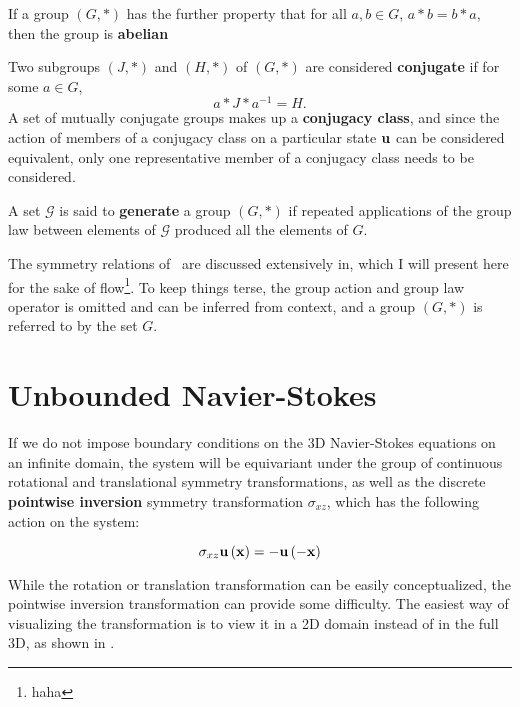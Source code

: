 \begin{define}
If a group $(G,\ast)$ has the further property that for all $a,b \in G$, $a \ast b = b \ast a$, then the group is {\bf abelian}
\end{define}
\begin{define}\label{def:conjugacy}
Two subgroups $(J,\ast)$ and $(H,\ast)$ of $(G,\ast)$ are considered {\bf conjugate} if for some $a \in G$,
\begin{equation}
a\ast J \ast a^{-1} = H.
\end{equation} 
A set of mutually conjugate groups makes up a {\bf conjugacy class}, and since the action of members of a conjugacy class on a particular state $\mathbf{u}$ can be considered equivalent, only one representative member of a conjugacy class needs to be considered. 
\end{define}
\begin{define}
A set $\mathcal{G}$ is said to {\bf generate} a group $(G,\ast)$ if repeated applications of the group law between elements of $\mathcal{G}$ produced all the elements of $G$.
\end{define}
The symmetry relations of \pCf\ are discussed extensively in, which I will present here for the sake of flow\footnote{haha}. To keep things terse, the group action and group law operator is omitted and can be inferred from context, and a group $(G,\ast)$ is referred to by the set $G$. 
\section{Unbounded Navier-Stokes}

If we do not impose boundary conditions on the 3D Navier-Stokes equations on an infinite domain, the system will be equivariant under the group of continuous rotational and translational symmetry transformations, as well as the discrete {\bf pointwise inversion} symmetry transformation $\sigma_{xz}$, which has the following action on the system:

\begin{equation}\label{eq:pointwiseinversion}
\sigma_{xz}\mathbf{u}\left ( \mathbf{x} \right ) = -\mathbf{u}\left ( -\mathbf{x} \right )
\end{equation}

While the rotation or translation transformation can be easily conceptualized, the pointwise inversion transformation can provide some difficulty. The easiest way of visualizing the transformation is to view it in a 2D domain instead of in the full 3D, as shown in . 

